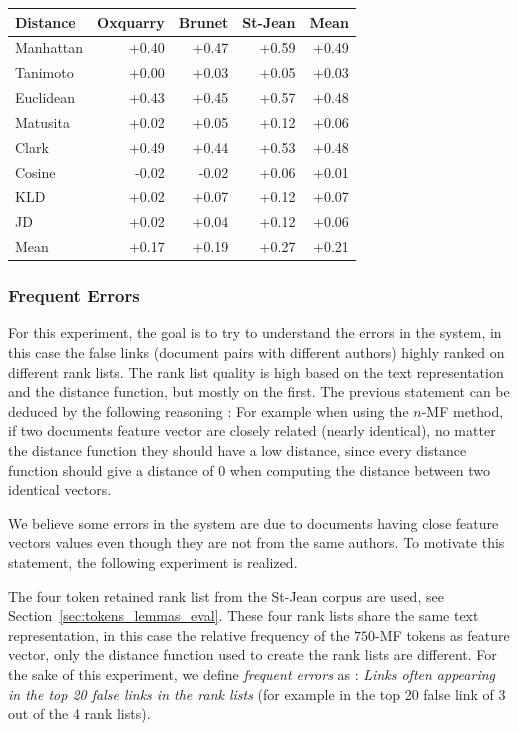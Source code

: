 \begin{table}
  \vspace{0.5cm}

  \label{tab:gain_750_mf}
  \begin{tabular}{l r r r|r}
    \toprule
    Distance & Oxquarry & Brunet & St-Jean & Mean \\
    \midrule
    Manhattan & +0.40 & +0.47 & +0.59 & +0.49 \\
    Tanimoto  & +0.00 & +0.03 & +0.05 & +0.03 \\
    Euclidean & +0.43 & +0.45 & +0.57 & +0.48 \\
    Matusita  & +0.02 & +0.05 & +0.12 & +0.06 \\
    Clark     & +0.49 & +0.44 & +0.53 & +0.48 \\
    Cosine    & -0.02 & -0.02 & +0.06 & +0.01 \\
    KLD       & +0.02 & +0.07 & +0.12 & +0.07 \\
    JD        & +0.02 & +0.04 & +0.12 & +0.06 \\
    \midrule
    Mean      & +0.17 & +0.19 & +0.27 & +0.21 \\
    \bottomrule
  \end{tabular}
\end{table}

\subsubsection{Frequent Errors \label{sec:frequent_errors}}

For this experiment, the goal is to try to understand the errors in the system, in this case the false links (document pairs with different authors) highly ranked on different rank lists.
The rank list quality is high based on the text representation and the distance function, but mostly on the first.
The previous statement can be deduced by the following reasoning : For example when using the $n$-MF method, if two documents feature vector are closely related (nearly identical), no matter the distance function they should have a low distance, since every distance function should give a distance of 0 when computing the distance between two identical vectors.

We believe some errors in the system are due to documents having close feature vectors values even though they are not from the same authors.
To motivate this statement, the following experiment is realized.

The four token retained rank list from the St-Jean corpus are used, see Section~\ref{sec:tokens_lemmas_eval}.
These four rank lists share the same text representation, in this case the relative frequency of the $750$-MF tokens as feature vector, only the distance function used to create the rank lists are different.
For the sake of this experiment, we define \textit{frequent errors} as : \textit{Links often appearing in the top 20 false links in the rank lists} (for example in the top 20 false link of 3 out of the 4 rank lists).

